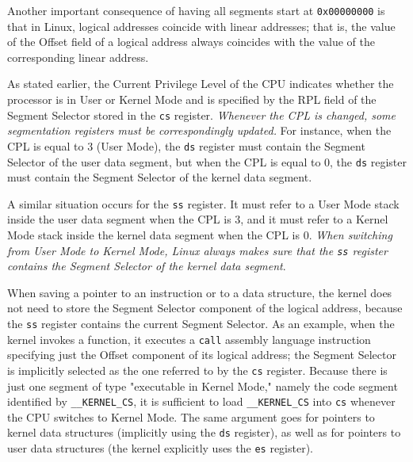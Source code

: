 Another important consequence of having all segments start at \texttt{0x00000000} is that in
Linux, logical addresses coincide with linear addresses; that is, the value of the Offset
field of a logical address always coincides with the value of the corresponding linear
address.

As stated earlier, the Current Privilege Level of the CPU indicates whether the processor
is in User or Kernel Mode and is specified by the RPL field of the Segment Selector stored
in the \texttt{cs} register. \emph{Whenever the CPL is changed, some segmentation registers
  must be correspondingly updated.} For instance, when the CPL is equal to 3 (User Mode),
the \texttt{ds} register must contain the Segment Selector of the user data segment, but
when the CPL is equal to 0, the \texttt{ds} register must contain the Segment Selector of
the kernel data segment.

A similar situation occurs for the \texttt{ss} register. It must refer to a User Mode stack
inside the user data segment when the CPL is 3, and it must refer to a Kernel Mode stack
inside the kernel data segment when the CPL is 0. \emph{When switching from User Mode to
  Kernel Mode, Linux always makes sure that the \texttt{ss} register contains the Segment
  Selector of the kernel data segment}.

When saving a pointer to an instruction or to a data structure, the kernel does not need
to store the Segment Selector component of the logical address, because the \texttt{ss}
register contains the current Segment Selector. As an example, when the kernel invokes a
function, it executes a \texttt{call} assembly language instruction specifying just the
Offset component of its logical address; the Segment Selector is implicitly selected as
the one referred to by the \texttt{cs} register. Because there is just one segment of type
"executable in Kernel Mode," namely the code segment identified by \texttt{\_\_KERNEL\_CS},
it is sufficient to load \texttt{\_\_KERNEL\_CS} into \texttt{cs} whenever the CPU switches to
Kernel Mode. The same argument goes for pointers to kernel data structures (implicitly
using the \texttt{ds} register), as well as for pointers to user data structures (the kernel
explicitly uses the \texttt{es} register).


